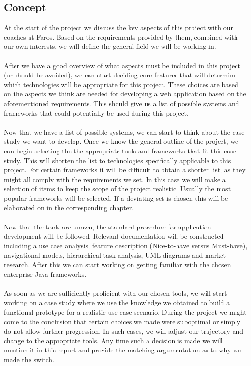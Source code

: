 \documentclass[12pt]{article}
\begin{document}
\subsection{Concept}
At the start of the project we discuss the key aspects of this project with our coaches at Faros. Based on the requirements provided by them, combined with our own interests, we will define the general field we will be working in. 
\\\\
After we have a good overview of what aspects must be included in this project (or should be avoided), we can start deciding core features that will determine which technologies will be appropriate for this project. These choices are based on the aspects we think are needed for developing a web application based on the aforementioned requirements. This should give us a list of possible systems and frameworks that could potentially be used during this project.
\\\\
Now that we have a list of possible systems, we can start to think about the case study we want to develop. Once we know the general outline of the project, we can begin selecting the the appropriate tools and frameworks that fit this case study. This will shorten the list to technologies specifically applicable to this project. For certain frameworks it will be difficult to obtain a shorter list, as they might all comply with the requirements we set. In this case we will make a selection of items to keep the scope of the project realistic. Usually the most popular frameworks will be selected. If a deviating set is chosen this will be elaborated on in the corresponding chapter.
\\\\
Now that the tools are known, the standard procedure for application development will be followed. Relevant documentation will be constructed including a use case analysis, feature description (Nice-to-have versus Must-have), navigational models, hierarchical task analysis, UML diagrams and market research. After this we can start working on getting familiar with the chosen enterprise Java frameworks.
\\\\
As soon as we are sufficiently proficient with our chosen tools, we will start working on a case study where we use the knowledge we obtained to build a functional prototype for a realistic use case scenario. During the project we might come to the conclusion that certain choices we made were suboptimal or simply do not allow further progression. In such cases, we will adjust our trajectory and change to the appropriate tools. Any time such a decision is made we will mention it in this report and provide the matching argumentation as to why we made the switch.
\end{document}
